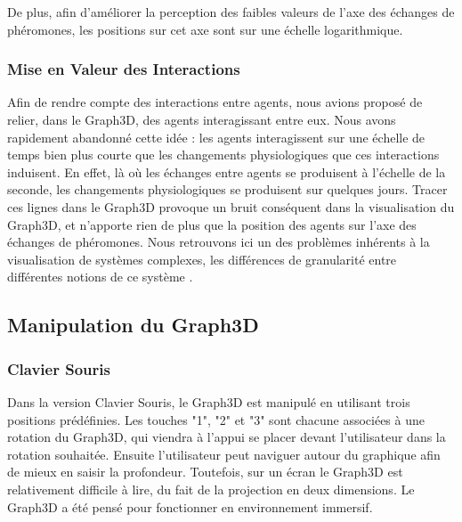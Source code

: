 	De plus, afin d'améliorer la perception des faibles valeurs de l'axe des échanges de phéromones, les positions sur cet axe sont sur une échelle logarithmique.
	
	\subsubsection{Mise en Valeur des Interactions}
	Afin de rendre compte des interactions entre agents, nous avions proposé de relier, dans le Graph3D, des agents interagissant entre eux. Nous avons rapidement abandonné cette idée : les agents interagissent sur une échelle de temps bien plus courte que les changements physiologiques que ces interactions induisent. En effet, là où les échanges entre agents se produisent à l'échelle de la seconde, les changements physiologiques se produisent sur quelques jours. Tracer ces lignes dans le Graph3D provoque un bruit conséquent dans la visualisation du Graph3D, et n'apporte rien de plus que la position des agents sur l'axe des échanges de phéromones. Nous retrouvons ici un des problèmes inhérents à la visualisation de systèmes complexes, les différences de granularité entre différentes notions de ce système \cite{hutzler_du_2000}.
	
	\subsection{Manipulation du Graph3D}
	
		\subsubsection{Clavier Souris}
		Dans la version Clavier Souris, le Graph3D est manipulé en utilisant trois positions prédéfinies. Les touches "1", "2" et "3" sont chacune associées à une rotation du Graph3D, qui viendra à l'appui se placer devant l'utilisateur dans la rotation souhaitée. Ensuite l'utilisateur peut naviguer autour du graphique afin de mieux en saisir la profondeur. Toutefois, sur un écran le Graph3D est relativement difficile à lire, du fait de la projection en deux dimensions. Le Graph3D a été pensé pour fonctionner en environnement immersif.
		
